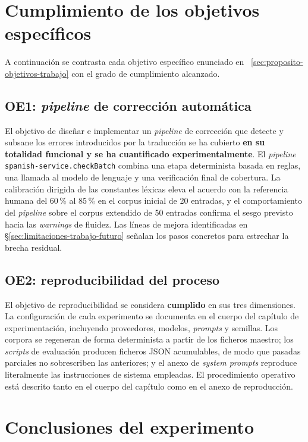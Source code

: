 \section{Cumplimiento de los objetivos específicos}
\label{sec:cierre-objetivos}

A continuación se contrasta cada objetivo específico enunciado en
~\ref{sec:proposito-objetivos-trabajo} con el grado de cumplimiento alcanzado.

\subsection*{OE1: \textit{pipeline} de corrección automática}

El objetivo de diseñar e implementar un \textit{pipeline} de corrección que
detecte y subsane los errores introducidos por la traducción se ha cubierto
\textbf{en su totalidad funcional y se ha cuantificado experimentalmente}. El
\textit{pipeline} \texttt{spanish-service.checkBatch} combina una etapa
determinista basada en reglas, una llamada al modelo de lenguaje y una
verificación final de cobertura. La calibración dirigida de las constantes
léxicas eleva el acuerdo con la referencia humana del 60\,\% al 85\,\% en el
corpus inicial de 20 entradas, y el comportamiento del \textit{pipeline} sobre
el corpus extendido de 50 entradas confirma el sesgo previsto hacia las
\textit{warnings} de fluidez. Las líneas de mejora identificadas en
§\ref{sec:limitaciones-trabajo-futuro} señalan los pasos concretos para
estrechar la brecha residual.

\subsection*{OE2: reproducibilidad del proceso}

El objetivo de reproducibilidad se considera \textbf{cumplido} en sus tres
dimensiones. La configuración de cada experimento se documenta en el cuerpo del
capítulo de experimentación, incluyendo proveedores, modelos, \textit{prompts}
y semillas. Los corpora se regeneran de forma determinista a partir de los
ficheros maestro; los \textit{scripts} de evaluación producen ficheros JSON
acumulables, de modo que pasadas parciales no sobrescriben las anteriores; y el
anexo de \textit{system prompts} reproduce literalmente las instrucciones de
sistema empleadas. El procedimiento operativo está descrito tanto en el cuerpo
del capítulo como en el anexo de reproducción.

\section{Conclusiones del experimento}

